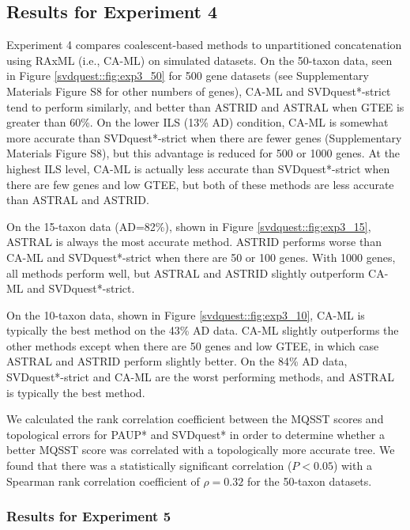 \clearpage

\subsection{Results for Experiment 4}

Experiment 4 compares coalescent-based methods to unpartitioned
concatenation using RAxML (i.e., CA-ML) on simulated datasets.  On the 50-taxon data, seen in
Figure \ref{svdquest::fig:exp3_50} for 500 gene datasets
{(see Supplementary Materials Figure S8 for other numbers of genes)},
CA-ML and SVDquest*-strict tend to perform similarly, and better than ASTRID
and ASTRAL when GTEE is greater than 60\%.  
On the lower ILS (13\% AD)
condition, CA-ML is somewhat more accurate than SVDquest*-strict when there
are fewer genes  {(Supplementary Materials Figure S8)}, but this advantage is
reduced for 500 or 1000 genes. At the highest ILS level, CA-ML is
actually less accurate than SVDquest*-strict when there are few genes and low
GTEE, but both of these methods are less accurate than ASTRAL and
ASTRID.

On the 15-taxon data (AD=82\%), shown in Figure \ref{svdquest::fig:exp3_15}, 
ASTRAL is always the
most accurate method. ASTRID performs worse than CA-ML and
SVDquest*-strict when there are 50 or 100 genes. With 1000 genes, all methods
perform well, but ASTRAL and ASTRID slightly outperform CA-ML and
SVDquest*-strict. 

On the 10-taxon data, shown in Figure \ref{svdquest::fig:exp3_10}, CA-ML is
typically the best method on the 43\% AD  data. 
CA-ML slightly
outperforms the other methods except when there are 50 genes and low
GTEE, in which case ASTRAL and ASTRID perform slightly better. On the
84\% AD  data, SVDquest*-strict and CA-ML are the worst performing
methods, and ASTRAL is typically the best method.

We calculated the rank correlation coefficient between
the MQSST scores and topological errors for PAUP* and SVDquest* in
order to determine whether a better MQSST score was correlated with a topologically
more accurate tree. 
We found that there was a statistically
significant correlation ($P < 0.05$) with a Spearman rank correlation coefficient of $\rho = 0.32$ for the 50-taxon datasets.


\subsubsection{Results for Experiment 5}



